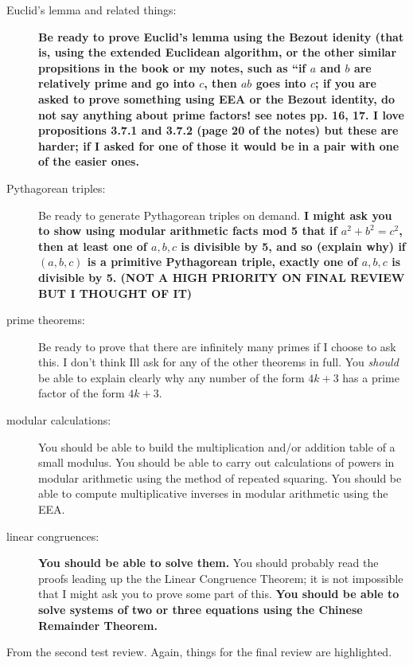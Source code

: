 \documentclass[12pt]{article}
\begin{document}
\begin{description}
\item[Euclid's lemma and related things:]  {\bf Be ready to prove Euclid's lemma using the Bezout idenity (that is, using the extended Euclidean algorithm, or the other similar propsitions in the book or my notes, such as ``if $a$ and $b$ are relatively prime and go into $c$, then $ab$ goes into $c$;   if you are asked to prove something using EEA or the Bezout identity, do not say anything about prime factors!  see notes pp. 16, 17.   I love propositions 3.7.1 and 3.7.2 (page 20 of the notes) but these are harder;  if I asked for one of those it would be in a pair with one of the easier ones.}

\item[Pythagorean triples:]   Be ready to generate Pythagorean triples on demand.  {\bf I might ask you to show using modular arithmetic facts mod 5
that if $a^2+b^2 = c^2$, then at least one of $a,b,c$ is divisible by 5, and so (explain why) if $(a,b,c)$ is a primitive Pythagorean triple, exactly one of $a,b,c$ is divisible by 5. (NOT A HIGH PRIORITY ON FINAL REVIEW BUT I THOUGHT OF IT)}

\item[prime theorems:]    Be ready to prove that there are infinitely many primes if I choose to ask this.  I don't think Ill ask for any of the other theorems in full.  You {\em should\/} be able to explain clearly why any number of the form $4k+3$ has a prime factor of the form $4k+3$.

\item[modular calculations:]  You should be able to build the multiplication and/or addition table of a small modulus.
You should be able to carry out calculations of powers in modular arithmetic using the method of repeated squaring. You should be able to compute multiplicative inverses in modular arithmetic using the EEA.

\item[linear congruences:]  {\bf You should be able to solve them.}  You should probably read the
proofs leading up the the Linear Congruence Theorem;   it is not impossible that I might ask you to prove some part of this.  {\bf You should be able to solve systems of two or three equations using the Chinese Remainder Theorem.}



\end{description}


From the second test review.  Again, things for the final review are highlighted.
\end{document}
